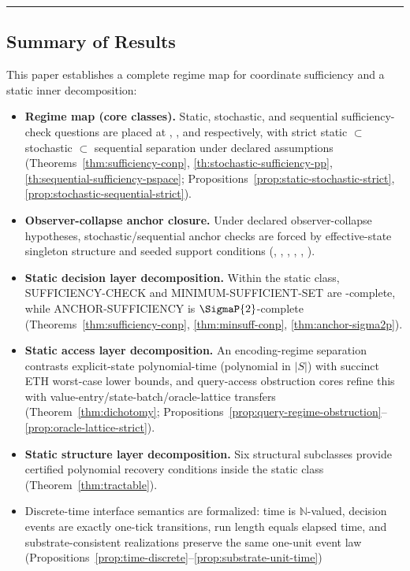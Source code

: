 \begin{center}\rule{0.5\linewidth}{0.5pt}\end{center}

\subsection*{Summary of Results}

This paper establishes a complete regime map for coordinate sufficiency and a static inner decomposition:

\begin{itemize}
\item \textbf{Regime map (core classes).} Static, stochastic, and sequential sufficiency-check questions are placed at \coNP, \PP, and \PSPACE respectively, with strict static \(\subset\) stochastic \(\subset\) sequential separation under declared assumptions (Theorems~\ref{thm:sufficiency-conp}, \ref{th:stochastic-sufficiency-pp}, \ref{th:sequential-sufficiency-pspace}; Propositions~\ref{prop:static-stochastic-strict}, \ref{prop:stochastic-sequential-strict}).
\item \textbf{Observer-collapse anchor closure.} Under declared observer-collapse hypotheses, stochastic/sequential anchor checks are forced by effective-state singleton structure and seeded support conditions (, , , , , ).
\item \textbf{Static decision layer decomposition.} Within the static class, SUFFICIENCY-CHECK and MINIMUM-SUFFICIENT-SET are \coNP-complete, while ANCHOR-SUFFICIENCY is \(\SigmaP{2}\)-complete (Theorems~\ref{thm:sufficiency-conp}, \ref{thm:minsuff-conp}, \ref{thm:anchor-sigma2p}).
\item \textbf{Static access layer decomposition.} An encoding-regime separation contrasts explicit-state polynomial-time (polynomial in $|S|$) with succinct ETH worst-case lower bounds, and query-access obstruction cores refine this with value-entry/state-batch/oracle-lattice transfers (Theorem~\ref{thm:dichotomy}; Propositions~\ref{prop:query-regime-obstruction}--\ref{prop:oracle-lattice-strict}).
\item \textbf{Static structure layer decomposition.} Six structural subclasses provide certified polynomial recovery conditions inside the static class (Theorem~\ref{thm:tractable}).
\item Discrete-time interface semantics are formalized: time is $\mathbb{N}$-valued, decision events are exactly one-tick transitions, run length equals elapsed time, and substrate-consistent realizations preserve the same one-unit event law (Propositions~\ref{prop:time-discrete}--\ref{prop:substrate-unit-time})

\end{itemize}
